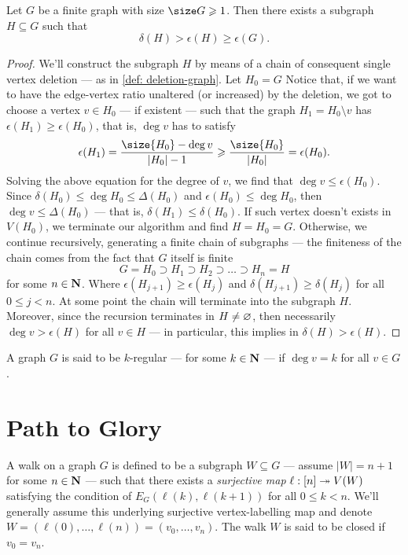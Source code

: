 \begin{proposition}\label{prop: edge-dense-subgraph}
Let \(G\) be a finite graph with size \(\size G \geq 1\). Then there exists a
subgraph \(H \subseteq G\) such that
\[
  \delta(H) > \epsilon(H) \geq \epsilon(G).
\]
\end{proposition}

\begin{proof}
We'll construct the subgraph \(H\) by means of a chain of consequent single
vertex deletion --- as in \cref{def: deletion-graph}. Let \(H_0 = G\) Notice that,
if we want to have the edge-vertex ratio unaltered (or increased) by the
deletion, we got to choose a vertex \(v \in H_0\) --- if existent --- such that the
graph \(H_1 = H_0 \setminus v\) has \(\epsilon(H_1) \geq \epsilon(H_0)\), that is, \(\deg v\) has to
satisfy
\[
  \epsilon(H_1) = \frac{\size{H_0} - \deg v}{|H_0| - 1}
  \geq \frac{\size{H_0}}{|H_0|} = \epsilon(H_0).
\]
Solving the above equation for the degree of \(v\), we find that \(\deg v \leq
\epsilon(H_0)\). Since \(\delta(H_0) \leq \deg H_0 \leq \Delta(H_0)\) and \(\epsilon(H_0) \leq \deg H_0\), then
\(\deg v \leq \Delta(H_0)\) --- that is, \(\delta(H_1) \leq \delta(H_0)\). If such vertex doesn't
exists in \(V(H_0)\), we terminate our algorithm and find \(H = H_0 =
G\). Otherwise, we continue recursively, generating a finite chain of subgraphs
--- the finiteness of the chain comes from the fact that \(G\) itself is finite
\[
  G = H_0 \supset H_1 \supset H_2 \supset \dots \supset H_n = H
\]
for some \(n \in \mathbf{N}\). Where \(\epsilon(H_{j+1}) \geq \epsilon(H_j)\) and \(\delta(H_{j+1}) \geq \delta(H_j)\)
for all \(0 \leq j < n\). At some point the chain will terminate into the subgraph
\(H\). Moreover, since the recursion terminates in \(H \neq \varnothing\), then
necessarily \(\deg v > \epsilon(H)\) for all \(v \in H\) --- in particular, this implies in
\(\delta(H) > \epsilon(H)\).
\end{proof}

\begin{definition}\label{def: k-regular}
A graph \(G\) is said to be \(k\)-regular --- for some \(k \in \mathbf{N}\) --- if
\(\deg v = k\) for all \(v \in G\).
\end{definition}

\section{Path to Glory}

\begin{definition}[Walk]\label{def: walk}
A walk on a graph \(G\) is defined to be a subgraph \(W \subseteq G\) --- assume \(|W| = n
+ 1\) for some \(n \in \mathbf{N}\) --- such that there exists a \emph{surjective map} \(\ell:
[n] \twoheadrightarrow V(W)\) satisfying the condition of \(E_G(\ell(k), \ell(k + 1))\) for all \(0
\leq k < n\). We'll generally assume this underlying surjective vertex-labelling
map and denote \(W = (\ell(0), \dots, \ell(n)) = (v_0, \dots, v_n)\). The walk \(W\)
is said to be closed if \(v_0 = v_n\).
\end{definition}

